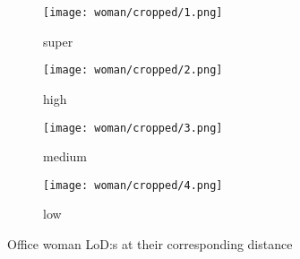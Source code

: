 \begin{figure}[ht]
  \centering
  \begin{subfigure}[b]{.22\textwidth}
    \texttt{[image: woman/cropped/1.png]}
    \caption{super}
    \label{fig:woman0}
  \end{subfigure}
  \begin{subfigure}[b]{.22\textwidth}
    \texttt{[image: woman/cropped/2.png]}
    \caption{high}
    \label{fig:woman1}
  \end{subfigure}
  \centering
  \begin{subfigure}[b]{.22\textwidth}
    \texttt{[image: woman/cropped/3.png]} 
    \caption{medium}
    \label{fig:woman2}
  \end{subfigure}
  \begin{subfigure}[b]{.22\textwidth}
    \texttt{[image: woman/cropped/4.png]}
    \caption{low}
    \label{fig:woman3}
  \end{subfigure}
  \caption{Office woman LoD:s at their corresponding distance} 
  \label{fig:woman_lod}
\end{figure}


